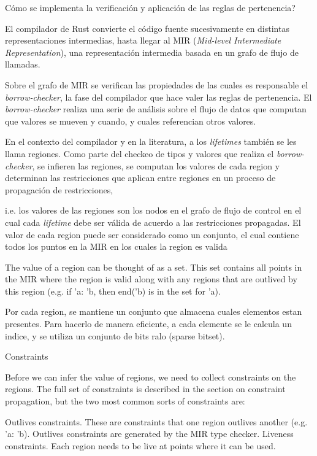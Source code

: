 \documentclass[11pt, a4paper]{article}
\begin{document}
Cómo se implementa la verificación y aplicación de las reglas de pertenencia?

El compilador de Rust convierte el código fuente sucesivamente en distintas representaciones intermedias, hasta llegar al MIR (\textit{Mid-level Intermediate Representation}), una representación intermedia basada en un grafo de flujo de llamadas.

Sobre el grafo de MIR se verifican las propiedades de las cuales es responsable el \textit{borrow-checker}, la fase del compilador que hace valer las reglas de pertenencia.
El \textit{borrow-checker} realiza una serie de análisis sobre el flujo de datos que computan que valores se mueven y cuando, y cuales referencian otros valores.

En el contexto del compilador y en la literatura, a los \textit{lifetimes} también se les llama regiones.
Como parte del checkeo de tipos y valores que realiza el \textit{borrow-checker}, se infieren las regiones, se computan los valores de cada region y determinan las restricciones que aplican entre regiones en un proceso de propagación de restricciones,

i.e. los valores de las regiones son los nodos en el grafo de flujo de control en el cual cada \textit{lifetime} debe ser válida de acuerdo a las restricciones propagadas.
El valor de cada region puede ser considerado como un conjunto, el cual contiene todos los puntos en la MIR en los cuales la region es valida


The value of a region can be thought of as a set. This set contains all points in the MIR where the region is valid along with any regions that are outlived by this region (e.g. if 'a: 'b, then end('b) is in the set for 'a).

Por cada region, se mantiene un conjunto que almacena cuales elementos estan presentes. Para hacerlo de manera eficiente, a cada elemente se le calcula un indice, y se utiliza un conjunto de bits ralo (sparse bitset). 

Constraints

Before we can infer the value of regions, we need to collect constraints on the regions. The full set of constraints is described in the section on constraint propagation, but the two most common sorts of constraints are:

    Outlives constraints. These are constraints that one region outlives another (e.g. 'a: 'b). Outlives constraints are generated by the MIR type checker.
    Liveness constraints. Each region needs to be live at points where it can be used.
\end{document}
